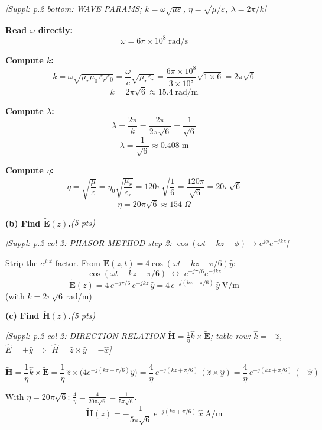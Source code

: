 \documentclass[11pt,letterpaper]{article}
\newcommand{\refbox}[1]{\textcolor{ref}{\textit{[Suppl: #1]}}}
\newcommand{\ptag}[1]{\hfill\textit{(#1 pts)}}
\begin{document}
\refbox{p.2 bottom: WAVE PARAMS; $k=\omega\sqrt{\mu\varepsilon}$, $\eta=\sqrt{\mu/\varepsilon}$, $\lambda=2\pi/k$}

\textbf{Read $\omega$ directly:}
\[
\boxed{\omega = 6\pi\times10^8\;\text{rad/s}}
\]

\textbf{Compute $k$:}
\[
k = \omega\sqrt{\mu_r\mu_0\,\varepsilon_r\varepsilon_0}
= \frac{\omega}{c}\sqrt{\mu_r\varepsilon_r}
= \frac{6\pi\times10^8}{3\times10^8}\sqrt{1\times6}
= 2\pi\sqrt{6}
\]
\[
\boxed{k = 2\pi\sqrt{6}\approx 15.4\;\text{rad/m}}
\]

\textbf{Compute $\lambda$:}
\[
\lambda = \frac{2\pi}{k} = \frac{2\pi}{2\pi\sqrt{6}} = \frac{1}{\sqrt{6}}
\]
\[
\boxed{\lambda = \frac{1}{\sqrt{6}}\approx 0.408\;\text{m}}
\]

\textbf{Compute $\eta$:}
\[
\eta = \sqrt{\frac{\mu}{\varepsilon}}
= \eta_0\sqrt{\frac{\mu_r}{\varepsilon_r}}
= 120\pi\sqrt{\frac{1}{6}}
= \frac{120\pi}{\sqrt{6}}
= 20\pi\sqrt{6}
\]
\[
\boxed{\eta = 20\pi\sqrt{6}\approx 154\;\Omega}
\]

\medskip

\textbf{(b) Find $\tilde{\mathbf{E}}(z)$.}\ptag{5}

\refbox{p.2 col 2: PHASOR METHOD step 2: $\cos(\omega t-kz+\phi)\to e^{j\phi}e^{-jkz}$}

Strip the $e^{j\omega t}$ factor. From $\mathbf{E}(z,t)=4\cos(\omega t-kz-\pi/6)\hat{y}$:
\[
\cos(\omega t - kz - \pi/6) \;\longleftrightarrow\; e^{-j\pi/6}e^{-jkz}
\]
\[
\boxed{\tilde{\mathbf{E}}(z) = 4\,e^{-j\pi/6}\,e^{-jkz}\,\hat{y}
= 4\,e^{-j(kz+\pi/6)}\,\hat{y}\;\text{V/m}}
\]
(with $k=2\pi\sqrt{6}$\,rad/m)

\medskip

\textbf{(c) Find $\tilde{\mathbf{H}}(z)$.}\ptag{5}

\refbox{p.2 col 2: DIRECTION RELATION $\tilde{\mathbf{H}}=\frac{1}{\eta}\hat{k}\times\tilde{\mathbf{E}}$;
table row: $\hat{k}=+\hat{z}$, $\hat{E}=+\hat{y}$ $\Rightarrow$ $\hat{H}=\hat{z}\times\hat{y}=-\hat{x}$}

\[
\tilde{\mathbf{H}} = \frac{1}{\eta}\hat{k}\times\tilde{\mathbf{E}}
= \frac{1}{\eta}\,\hat{z}\times\bigl(4e^{-j(kz+\pi/6)}\hat{y}\bigr)
= \frac{4}{\eta}\,e^{-j(kz+\pi/6)}\,(\hat{z}\times\hat{y})
= \frac{4}{\eta}\,e^{-j(kz+\pi/6)}\,(-\hat{x})
\]

With $\eta=20\pi\sqrt{6}$: $\tfrac{4}{\eta}=\tfrac{4}{20\pi\sqrt{6}}=\tfrac{1}{5\pi\sqrt{6}}$.
\[
\boxed{\tilde{\mathbf{H}}(z) = -\frac{1}{5\pi\sqrt{6}}\,e^{-j(kz+\pi/6)}\,\hat{x}\;\text{A/m}}
\]
\end{document}
